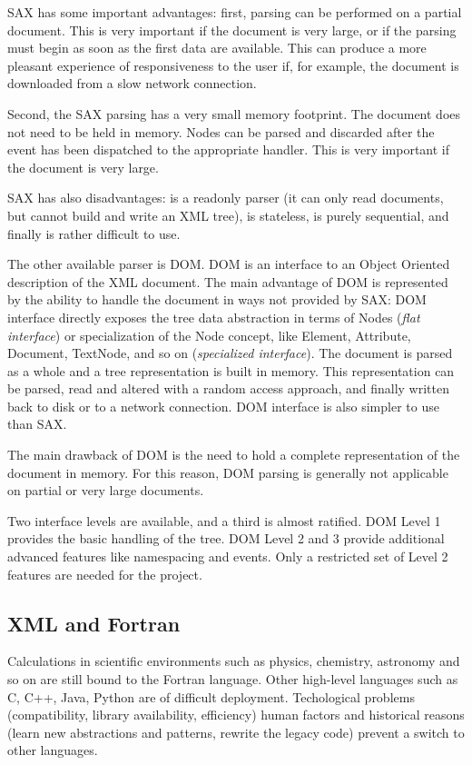 SAX has some important advantages: first, parsing can be performed on a
partial document. This is very important if the document is very large, or
if the parsing must begin as soon as the first data are available. This
can produce a more pleasant experience of responsiveness to the user if, for
example, the document is downloaded from a slow network connection.

Second, the SAX parsing has a very small memory footprint. The document does
not need to be held in memory. Nodes can be parsed and discarded after the
event has been dispatched to the appropriate handler. This is very important
if the document is very large. 

SAX has also disadvantages: is a readonly parser (it can only read
documents, but cannot build and write an XML tree), is stateless, is purely
sequential, and finally is rather difficult to use. 

The other available parser is DOM. DOM is an interface to an
{Object Oriented} description of the XML document. The main advantage of DOM
is represented by the ability to handle the document in ways not provided by
SAX: DOM interface directly exposes the tree data abstraction in terms of
Nodes (\textit{flat interface}) or specialization of the Node concept, like Element,
Attribute, Document, TextNode, and so on (\textit{specialized interface}).
The document is parsed as a whole and a tree representation is built in
memory. This representation can be parsed, read and altered with a random
access approach, and finally written back to disk or to a network
connection. DOM interface is also simpler to use than SAX. 

The main drawback of DOM is the need to hold a complete representation of
the document in memory. For this reason, DOM parsing is generally not
applicable on partial or very large documents.

Two interface levels are available, and a third is almost ratified.
DOM Level 1 provides the basic handling of the tree. DOM Level 2 and 3
provide additional advanced features like namespacing and events. Only a
restricted set of Level 2 features are needed for the project.

\subsection*{XML and Fortran}

Calculations in scientific environments such as physics, chemistry,
astronomy and so on are still bound to the Fortran language.  Other
high-level languages such as C, C++, Java, Python are of difficult
deployment.  Techological problems (compatibility, library availability,
efficiency) human factors and historical reasons (learn new abstractions and
patterns, rewrite the legacy code) prevent a switch to other languages.

